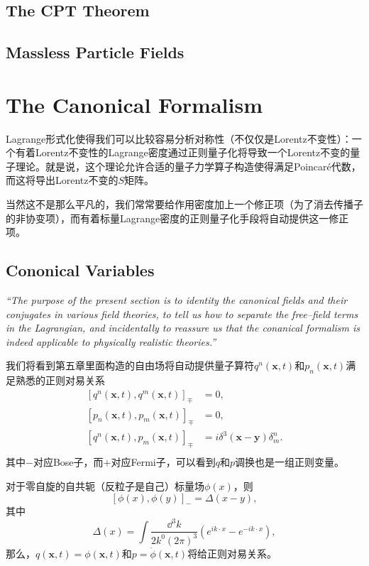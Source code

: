 \documentclass[10pt]{extbook}
\theoremstyle{plain}%
\newcommand{\re}[1]
	{\begin{center}
		\colorbox{shadecolor}{
		\begin{minipage}{135mm}
				\emph{``#1''}
			\end{minipage}}
	\end{center}}
\begin{document}
\section{The CPT Theorem}

\section{Massless Particle Fields}
\addtocounter{chapter}{1}
\chapter{The Canonical Formalism}
Lagrange形式化使得我们可以比较容易分析对称性（不仅仅是Lorentz不变性）：一个有着Lorentz不变性的Lagrange密度通过正则量子化将导致一个Lorentz不变的量子理论。就是说，这个理论允许合适的量子力学算子构造使得满足Poincar\'{e}代数，而这将导出Lorentz不变的$S$矩阵。

当然这不是那么平凡的，我们常常要给作用密度加上一个修正项（为了消去传播子的非协变项），而有着标量Lagrange密度的正则量子化手段将自动提供这一修正项。

\section{Cononical Variables}
\re{The purpose of the present section is to identity the canonical fields and their conjugates in various field theories, to tell us how to separate the free--field terms in the Lagrangian, and incidentally to reassure us that the conanical formalism is indeed applicable to physically realistic theories.}

我们将看到第五章里面构造的自由场将自动提供量子算符$q^n(\mathbf{x},t)$和$p_n(\mathbf{x},t)$满足熟悉的正则对易关系
\[
	\begin{split}
		[q^n(\mathbf{x},t),q^m(\mathbf{x},t)]_{\mp}&=0,\\
		[p_n(\mathbf{x},t),p_m(\mathbf{x},t)]_{\mp}&=0,\\
		[q^n(\mathbf{x},t),p_m(\mathbf{x},t)]_{\mp}&=i\delta^3(\mathbf{x}-\mathbf{y})\delta^n_m.\\
	\end{split}
\]
其中$-$对应Bose子，而$+$对应Fermi子，可以看到$q$和$p$调换也是一组正则变量。

对于零自旋的自共轭（反粒子是自己）标量场$\phi(x)$，则
\[
	[\phi(x),\phi(y)]_-=\Delta(x-y),
\]
其中
\[
	\Delta(x)=\int\frac{\dd^3 k}{2k^0 (2\pi)^3}(e^{ik\cdot x}-e^{-ik\cdot x}),
\]
那么，$q(\mathbf{x},t)=\phi(\mathbf{x},t)$和$p=\dot{\phi}(\mathbf{x},t)$将给正则对易关系。
\end{document}
